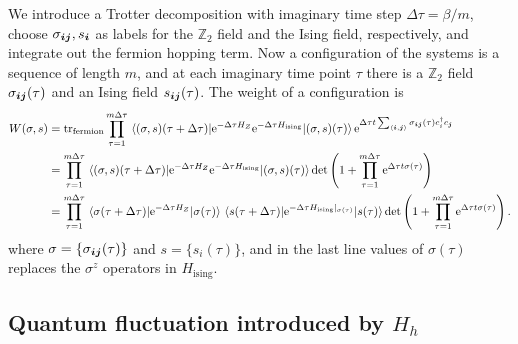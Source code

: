 \documentclass[hyperref, a4paper]{article}
\newcommand*{\ee}{\mathrm{e}}
\newcommand*{\pair}[1]{\langle #1 \rangle}
\begin{document}
We introduce a Trotter decomposition with imaginary time step $\Delta \tau = \beta / m$, choose $\sigma_{\vb*{i} \vb*{j}}, s_{\vb*{i}}$ as labels for the $\mathbb{Z}_2$ field and the Ising field, respectively, and integrate out the fermion hopping term. 
Now a configuration of the systems is a sequence of length $m$, and at each imaginary time point $\tau$ there is a $\mathbb{Z}_2$ field $\sigma_{\vb*{i} \vb*{j}}(\tau)$ and an Ising field $s_{\vb*{i} \vb*{j}}(\tau)$.
The weight of a configuration is 
\[
    \begin{aligned}
        W(\sigma, s) &= \trace_\text{fermion} \prod_{\tau = 1}^{m\Delta \tau} \mel{(\sigma, s)(\tau+\Delta \tau)}{\ee^{-\Delta \tau H_Z} \ee^{- \Delta \tau H_\text{ising}}}{(\sigma, s)(\tau)} \ee^{\Delta \tau t \sum_{\pair{\vb*{i}, \vb*{j}}} \sigma_{\vb*{i} \vb*{j}}(\tau) c_i^\dagger c_{\vb*{j}}} \\
        &= \prod_{\tau = 1}^{m\Delta \tau} \mel{(\sigma, s)(\tau+\Delta \tau)}{\ee^{-\Delta \tau H_Z} \ee^{- \Delta \tau H_\text{ising}}}{(\sigma, s)(\tau)} \det \left(1 + \prod_{\tau = 1}^{m\Delta \tau} \ee^{\Delta \tau t \sigma(\tau)}\right) \\
        &= \prod_{\tau = 1}^{m\Delta \tau} \mel{\sigma(\tau + \Delta \tau)}{\ee^{-\Delta \tau H_Z}}{\sigma(\tau)} \mel{s(\tau + \Delta \tau)}{\ee^{-\Delta \tau H_\text{ising}|_{\sigma(\tau)}}}{s(\tau)} \det \left(1 + \prod_{\tau = 1}^{m\Delta \tau} \ee^{\Delta \tau t \sigma(\tau)}\right).
    \end{aligned}
\]
where $\sigma = \{\sigma_{\vb*{i} \vb*{j}}(\tau)\}$ and $s = \{s_{i}(\tau)\}$, and in the last line values of $\sigma(\tau)$ replaces the $\sigma^z$ operators in $H_\text{ising}$.


\subsection{Quantum fluctuation introduced by $H_h$}
\end{document}
